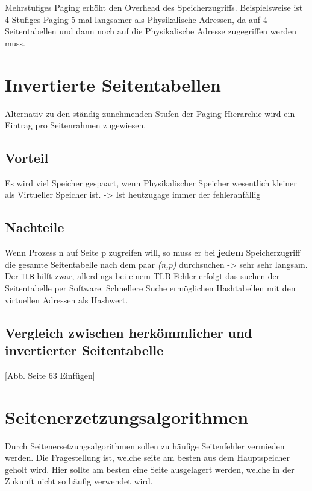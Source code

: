 Mehrstufiges Paging erhöht den Overhead des Speicherzugriffs. Beispielsweise ist 4-Stufiges Paging 5 mal langsamer als Physikalische Adressen, da auf 4 Seitentabellen und dann noch auf die Physikalische Adresse zugegriffen werden muss.

\section{Invertierte Seitentabellen}

Alternativ zu den ständig zunehmenden Stufen der Paging-Hierarchie wird ein Eintrag pro Seitenrahmen zugewiesen. 

\subsection*{Vorteil}

Es wird viel Speicher gespaart, wenn Physikalischer Speicher wesentlich kleiner als Virtueller Speicher ist. -> Ist heutzugage immer der fehleranfällig

\subsection*{Nachteile}

Wenn Prozess n auf Seite p zugreifen will, so muss er bei \textbf{jedem} Speicherzugriff die gesamte Seitentabelle nach dem paar \textit{(n,p)} durchsuchen -> sehr sehr langsam. Der \texttt{TLB} hilft zwar, allerdings bei einem TLB Fehler erfolgt das suchen der Seitentabelle per Software. Schnellere Suche ermöglichen Hashtabellen mit den virtuellen Adressen als Hashwert. 

\subsection*{Vergleich zwischen herkömmlicher und invertierter Seitentabelle}

[Abb. Seite 63 Einfügen]

\section{Seitenerzetzungsalgorithmen}

Durch Seitenersetzungsalgorithmen sollen zu häufige Seitenfehler vermieden werden. Die Fragestellung ist, welche seite am besten aus dem Hauptspeicher geholt wird. Hier sollte am besten eine Seite ausgelagert werden, welche in der Zukunft nicht so häufig verwendet wird. 

